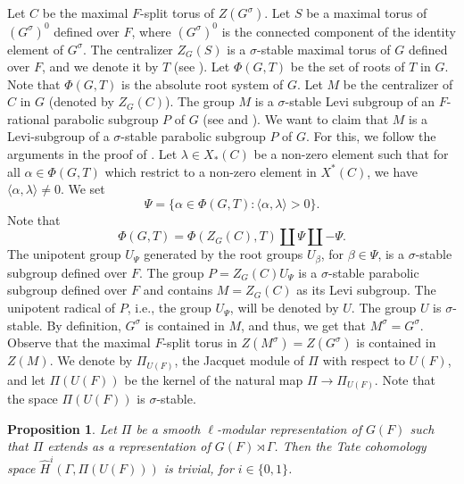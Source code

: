 \documentclass[10pt, reqno]{amsart}
\theoremstyle{plain}
\numberwithin{equation}{section}
\newtheorem{proposition}[theorem]{Proposition}
\begin{document}
Let $C$ be the maximal $F$-split torus of $Z(G^\sigma)$. Let $S$ be a
maximal torus of $(G^\sigma)^0$ defined over $F$, where $(G^\sigma)^0$
is the connected component of the identity element of $G^\sigma$.  The
centralizer $Z_G(S)$ is a $\sigma$-stable maximal torus of $G$ defined
over $F$, and we denote it by $T$ (see \cite[Proposition
12.8.1(2)]{kaletha_prasad}).  Let $\Phi(G, T)$ be the set of roots of
$T$ in $G$. Note that $\Phi(G, T)$ is the absolute root system of $G$.
Let $M$ be the centralizer of $C$ in $G$ (denoted by $Z_G(C)$).  The
group $M$ is a $\sigma$-stable Levi subgroup of an $F$-rational
parabolic subgroup $P$ of $G$ (see \cite[Proposition 20.4]{borel_book}
and \cite[Theorem 4.15]{borel_tits_gr}). We want to claim that $M$ is
a Levi-subgroup of a $\sigma$-stable parabolic subgroup $P$ of $G$.
For this, we follow the arguments in the proof of \cite[Proposition
20.4]{borel_book}. Let $\lambda\in X_\ast(C)$ be a non-zero element
such that for all $\alpha\in \Phi(G, T)$ which restrict to a non-zero
element in $X^\ast(C)$, we have $\langle\alpha, \lambda\rangle\neq
0$. We set
$$\Psi=\{\alpha\in \Phi(G, T): \langle\alpha, \lambda\rangle>0\}.$$
Note that 
$$\Phi(G, T)=\Phi(Z_G(C), T)\coprod \Psi\coprod -\Psi.$$
The unipotent group $U_\Psi$ generated by the root groups $U_\beta$,
for $\beta\in \Psi$, is a $\sigma$-stable subgroup defined over
$F$. The group $P=Z_G(C)U_\Psi$ is a $\sigma$-stable parabolic
subgroup defined over $F$ and contains $M=Z_G(C)$ as its Levi
subgroup.  The unipotent radical of $P$, i.e., the group $U_\Psi$,
will be denoted by $U$.  The group $U$ is $\sigma$-stable.  By
definition, $G^\sigma$ is contained in $M$, and thus, we get that
$M^\sigma=G^\sigma$. Observe that the maximal $F$-split torus in
$Z(M^\sigma)=Z(G^\sigma)$ is contained in $Z(M)$.  We denote by
$\Pi_{U(F)}$, the Jacquet module of $\Pi$ with respect to $U(F)$, and
let $\Pi(U(F))$ be the kernel of the natural map
$\Pi\rightarrow \Pi_{U(F)}$. Note that the space $\Pi(U(F))$ is
$\sigma$-stable.
\begin{proposition}\label{prop}
  Let $\Pi$ be a smooth $\ell$-modular representation of $G(F)$ such
  that $\Pi$ extends as a representation of $G(F)\rtimes \Gamma$. Then
  the Tate cohomology space $\widehat{H}^i(\Gamma, \Pi(U(F)))$ is
  trivial, for $i\in \{0,1\}$.
\end{proposition}
\end{document}
